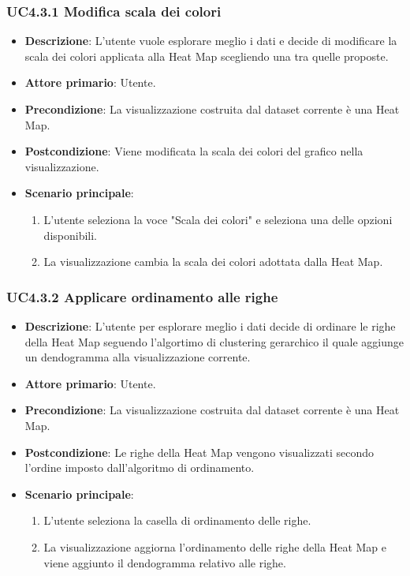 \subsubsection{UC4.3.1 Modifica scala dei colori}
\label{subsec:uc4.2.1}
\begin{itemize}
    \item \textbf{Descrizione}: L’utente vuole esplorare meglio i dati e decide di 
                                modificare la scala dei colori applicata alla Heat Map scegliendo una 
                                tra quelle proposte.
	
    \item \textbf{Attore primario}: Utente.
    
    \item \textbf{Precondizione}:   La visualizzazione costruita dal dataset corrente è una Heat Map.
    \item \textbf{Postcondizione}:  Viene modificata la scala dei colori del grafico nella visualizzazione.

	\item \textbf{Scenario principale}:
        \begin{enumerate}
            \item L'utente seleziona la voce "Scala dei colori" e seleziona una delle opzioni disponibili.
            \item La visualizzazione cambia la scala dei colori adottata dalla Heat Map.
        \end{enumerate}
\end{itemize}

\subsubsection{UC4.3.2 Applicare ordinamento alle righe}
\label{subsec:uc4.2.1}
\begin{itemize}
    \item \textbf{Descrizione}: L’utente per esplorare meglio i dati decide di ordinare le righe della Heat Map
                                seguendo l'algortimo di clustering gerarchico il quale aggiunge un dendogramma alla visualizzazione corrente.
	
    \item \textbf{Attore primario}: Utente.
    
    \item \textbf{Precondizione}:   La visualizzazione costruita dal dataset corrente è una Heat Map.
    \item \textbf{Postcondizione}:  Le righe della Heat Map vengono visualizzati secondo l'ordine imposto dall'algoritmo di ordinamento.

	\item \textbf{Scenario principale}:
        \begin{enumerate}
            \item   L'utente seleziona la casella di ordinamento delle righe.
            \item   La visualizzazione aggiorna l'ordinamento delle righe della Heat Map e viene aggiunto 
                    il dendogramma relativo alle righe.
        \end{enumerate}
\end{itemize}

